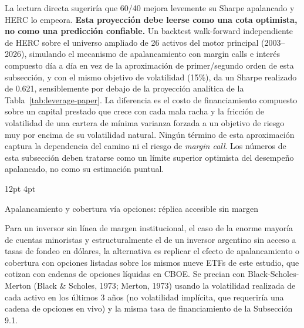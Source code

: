 \documentclass[11pt,a4paper]{article}
\makeatletter
\renewcommand\subsection{\@startsection{subsection}{2}{\z@}%
  {12pt \@plus 2pt \@minus 1pt}%
  {4pt}%
  {\raggedright\normalsize\bfseries\color{navyblue}}}
\makeatother
\begin{document}
La lectura directa sugeriría que 60/40 mejora levemente su Sharpe apalancado y HERC lo empeora. \textbf{Esta proyección debe leerse como una cota optimista, no como una predicción confiable.} Un backtest walk-forward independiente de HERC sobre el universo ampliado de 26 activos del motor principal (2003--2026), simulando el mecanismo de apalancamiento con margin calls e interés compuesto día a día en vez de la aproximación de primer/segundo orden de esta subsección, y con el mismo objetivo de volatilidad (15\%), da un Sharpe realizado de 0.621, sensiblemente por debajo de la proyección analítica de la Tabla~\ref{tab:leverage-paper}. La diferencia es el costo de financiamiento compuesto sobre un capital prestado que crece con cada mala racha y la fricción de volatilidad de una cartera de mínima varianza forzada a un objetivo de riesgo muy por encima de su volatilidad natural. Ningún término de esta aproximación captura la dependencia del camino ni el riesgo de \textit{margin call}. Los números de esta subsección deben tratarse como un límite superior optimista del desempeño apalancado, no como su estimación puntual.

\subsection{Apalancamiento y cobertura vía opciones: réplica accesible sin margen}

Para un inversor sin línea de margen institucional, el caso de la enorme mayoría de cuentas minoristas y estructuralmente el de un inversor argentino sin acceso a tasas de fondeo en dólares, la alternativa es replicar el efecto de apalancamiento o cobertura con opciones listadas sobre los mismos nueve ETFs de este estudio, que cotizan con cadenas de opciones líquidas en CBOE. Se precian con Black-Scholes-Merton (Black \& Scholes, 1973; Merton, 1973) usando la volatilidad realizada de cada activo en los últimos 3 años (no volatilidad implícita, que requeriría una cadena de opciones en vivo) y la misma tasa de financiamiento de la Subsección 9.1.
\end{document}
